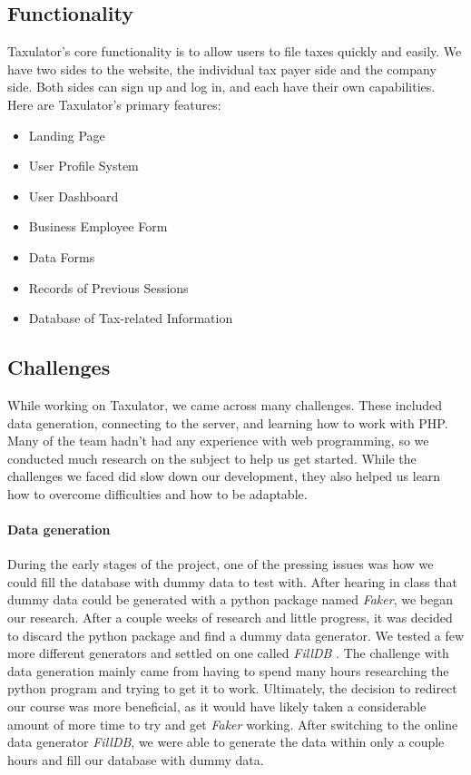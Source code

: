 \documentclass[sigconf]{acmart}
\begin{document}
\subsection{Functionality}
Taxulator’s core functionality is to allow users to file taxes quickly and easily. We have two sides to the website, the individual tax payer side and the company side. Both sides can sign up and log in, and each have their own capabilities. Here are Taxulator’s primary features:
\begin{itemize}
\item Landing Page
\item User Profile System
\item User Dashboard
\item Business Employee Form
\item Data Forms
\item Records of Previous Sessions
\item Database of Tax-related Information
\end{itemize}

\subsection{Challenges}
While working on Taxulator, we came across many challenges. These included data generation, connecting to the server, and learning how to work with PHP. Many of the team hadn't had any experience with web programming, so we conducted much research on the subject to help us get started. While the challenges we faced did slow down our development, they also helped us learn how to overcome difficulties and how to be adaptable.

\paragraph{Data generation}
During the early stages of the project, one of the pressing issues was how we could fill the database with dummy data to test with. After hearing in class that dummy data could be generated with a python package named \textit{Faker}, we began our research. After a couple weeks of research and little progress, it was decided to discard the python package and find a dummy data generator. We tested a few more different generators and settled on one called \textit{FillDB} \cite{FillDB}. The challenge with data generation mainly came from having to spend many hours researching the python program and trying to get it to work. Ultimately, the decision to redirect our course was more beneficial, as it would have likely taken a considerable amount of more time to try and get \textit{Faker} working. After switching to the online data generator \textit{FillDB}, we were able to generate the data within only a couple hours and fill our database with dummy data.
\end{document}
